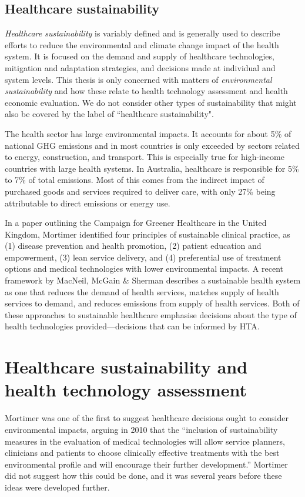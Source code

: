 \begin{refsection}
\subsection{Healthcare sustainability}
\textit{Healthcare sustainability} is variably defined and is generally used to describe efforts to reduce the environmental and climate change impact of the health system. It is focused on the demand and supply of healthcare technologies, mitigation and adaptation strategies, and decisions made at individual and system levels.\cite{mortimer_sustainable_2010, macneill_planetary_2021} This thesis is only concerned with matters of \textit{environmental sustainability} and how these relate to health technology assessment and health economic evaluation. We do not consider other types of sustainability that might also be covered by the label of ``healthcare sustainability".

The health sector has large environmental impacts. It accounts for about 5\% of national GHG emissions and in most countries is only exceeded by sectors related to energy, construction, and transport.\cite{pichler_international_2019, lenzen_environmental_2020} This is especially true for high-income countries with large health systems. In Australia, healthcare is responsible for 5\% to 7\% of total emissions.\cite{malik_carbon_2018, de_sain_estimates_2024} Most of this comes from the indirect impact of purchased goods and services required to deliver care, with only 27\% being attributable to direct emissions or energy use.\cite{de_sain_estimates_2024}

In a paper outlining the Campaign for Greener Healthcare in the United Kingdom, Mortimer identified four principles of sustainable clinical practice, as (1) disease prevention and health promotion, (2) patient education and empowerment, (3) lean service delivery, and (4) preferential use of treatment options and medical technologies with lower environmental impacts.\cite{mortimer_sustainable_2010} A recent framework by MacNeil, McGain \& Sherman describes a sustainable health system as one that reduces the demand of health services, matches supply of health services to demand, and reduces emissions from supply of health services.\cite{macneill_planetary_2021} Both of these approaches to sustainable healthcare emphasise decisions about the type of health technologies provided—decisions that can be informed by HTA. 

\section{Healthcare sustainability and health technology assessment}
Mortimer was one of the first to suggest healthcare decisions ought to consider environmental impacts, arguing in 2010 that the “inclusion of sustainability measures in the evaluation of medical technologies will allow service planners, clinicians and patients to choose clinically effective treatments with the best environmental profile and will encourage their further development.”\cite{mortimer_sustainable_2010} Mortimer did not suggest how this could be done, and it was several years before these ideas were developed further.


\end{refsection}
